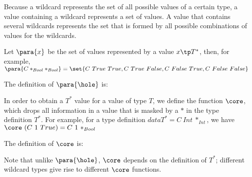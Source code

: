 
Because a wildcard represents the set of all possible values of a certain type, a value containing a wildcard represents a set of values. A value that contains several wildcards represents the set that is formed by all possible combinations of values for the wildcards. 

Let  $\para{x}$ be the set of values represented by a value $x \tp T^*$, then, for example,  $\para{C *_{Bool} *_{Bool}} = \set{C~True~True, C~True~False, C~False~True,C~False~False}$

The definition of $\para{\hole}$ is:



In order to obtain a $T^*$ value for a value of type $T$, we define the function $\core$, which drops all information in a value that is masked by a $*$ in the type definition $T^*$. For example, for a type definition $data T^* = C~Int~*_{Int}$, we have $\core~(C~1~True) = C~1~*_{Bool}$

The definition of $\core$ is:



Note that unlike $\para{\hole}$, $\core$ depends on the definition of $T^*$; different wildcard types give rise to different $\core$ functions.


